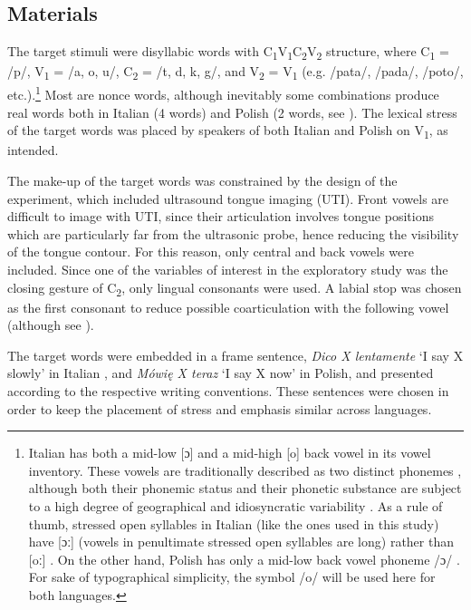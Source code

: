 \documentclass[preprint]{JASAnew}
\begin{document}
\hypertarget{materials}{%
\subsection{Materials}\label{materials}}

\label{s:materials}

The target stimuli were disyllabic words with
C\textsubscript{1}V\textsubscript{1}C\textsubscript{2}V\textsubscript{2}
structure, where C\textsubscript{1} = /p/, V\textsubscript{1} = /a, o,
u/, C\textsubscript{2} = /t, d, k, g/, and V\textsubscript{2} =
V\textsubscript{1} (e.g. /pata/, /pada/, /poto/,
etc.).\footnote{Italian has both a mid-low [ɔ] and a mid-high [o] back vowel in its vowel inventory. These vowels are traditionally described as two distinct phonemes \citep{kramer2009}, although both their phonemic status and their phonetic substance are subject to a high degree of geographical and idiosyncratic variability \citet{renwick2016}. As a rule of thumb, stressed open syllables in Italian (like the ones used in this study) have [ɔː] (vowels in penultimate stressed open syllables are long) rather than [oː] \citet{renwick2016}. On the other hand, Polish has only a mid-low back vowel phoneme /ɔ/ \citep{gussmann2007}. For sake of typographical simplicity, the symbol /o/ will be used here for both languages.}
Most are nonce words, although inevitably some combinations produce real
words both in Italian (4 words) and Polish (2 words, see
). The lexical stress of the target words was placed by
speakers of both Italian and Polish on V\textsubscript{1}, as intended.

The make-up of the target words was constrained by the design of the
experiment, which included ultrasound tongue imaging (UTI). Front vowels
are difficult to image with UTI, since their articulation involves
tongue positions which are particularly far from the ultrasonic probe,
hence reducing the visibility of the tongue contour. For this reason,
only central and back vowels were included. Since one of the variables
of interest in the exploratory study was the closing gesture of
C\textsubscript{2}, only lingual consonants were used. A labial stop was
chosen as the first consonant to reduce possible coarticulation with the
following vowel (although see \citealt{vazquez-alvarez2007}).

The target words were embedded in a frame sentence, \emph{Dico X
lentamente} `I say X slowly' in Italian \citep[following][]{hajek2008},
and \emph{Mówię X teraz} `I say X now' in Polish, and presented
according to the respective writing conventions. These sentences were
chosen in order to keep the placement of stress and emphasis similar
across languages.
\end{document}
